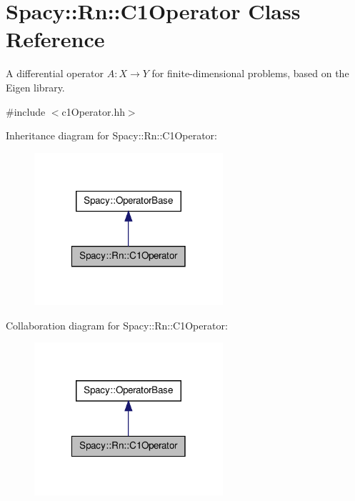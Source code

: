 \hypertarget{classSpacy_1_1Rn_1_1C1Operator}{\section{\-Spacy\-:\-:\-Rn\-:\-:\-C1\-Operator \-Class \-Reference}
\label{classSpacy_1_1Rn_1_1C1Operator}
}


\-A differential operator $A:X\rightarrow Y$ for finite-\/dimensional problems, based on the \-Eigen library.  




{\ttfamily \#include $<$c1\-Operator.\-hh$>$}



\-Inheritance diagram for \-Spacy\-:\-:\-Rn\-:\-:\-C1\-Operator\-:
\nopagebreak
\begin{figure}[H]
\begin{center}
\leavevmode
\includegraphics[width=198pt]{classSpacy_1_1Rn_1_1C1Operator__inherit__graph}
\end{center}
\end{figure}


\-Collaboration diagram for \-Spacy\-:\-:\-Rn\-:\-:\-C1\-Operator\-:
\nopagebreak
\begin{figure}[H]
\begin{center}
\leavevmode
\includegraphics[width=198pt]{classSpacy_1_1Rn_1_1C1Operator__coll__graph}
\end{center}
\end{figure}

